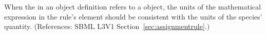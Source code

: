 When the  in an \AssignmentRule object definition refers to
a \Species object, the units of the mathematical expression in the rule's
 element should be consistent with the units of the species'
quantity.  (References: SBML L3V1 Section~\ref{sec:assignmentrule}.)
